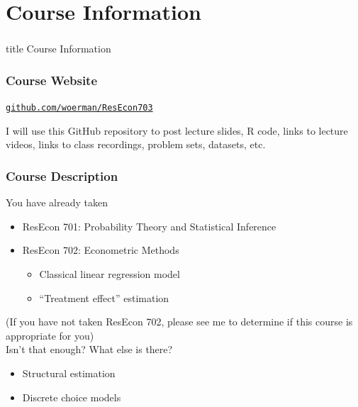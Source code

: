 \documentclass{beamer}
\begin{document}
\section{Course Information}
\label{information}
\begin{frame}\frametitle{}
    \vfill
    \centering
    \begin{beamercolorbox}[center]{title}
        \Large Course Information
    \end{beamercolorbox}
    \vfill
\end{frame}

\begin{frame}\frametitle{Course Website}
    \begin{center}
    	\href{https://github.com/woerman/ResEcon703}{\texttt{github.com/woerman/ResEcon703}}
    \end{center}
    \vspace{3ex}
    I will use this GitHub repository to post lecture slides, R code, links to lecture videos, links to class recordings, problem sets, datasets, etc.
\end{frame}

\begin{frame}\frametitle{Course Description}
    You have already taken
    \begin{itemize}
        \item ResEcon 701: Probability Theory and Statistical Inference
        \item ResEcon 702: Econometric Methods
        \begin{itemize}
            \item Classical linear regression model
            \item ``Treatment effect'' estimation
        \end{itemize}
    \end{itemize}
    (If you have not taken ResEcon 702, please see me to determine if this course is appropriate for you) \\
    \vspace{3ex}
    Isn't that enough? What else is there?
    \begin{itemize}
        \item Structural estimation
        \item Discrete choice models
    \end{itemize}
\end{frame}
\end{document}
